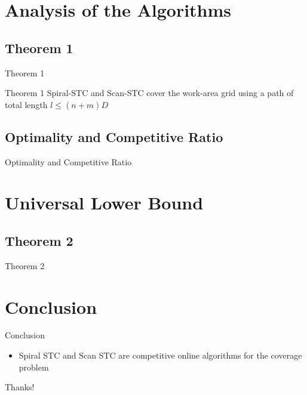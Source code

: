\documentclass{beamer}
\begin{document}
\section{Analysis of the Algorithms}
\subsection{Theorem 1}
\begin{frame}{Theorem 1}
    \begin{block}{Theorem 1}
        Spiral-STC and Scan-STC cover the work-area grid using a path of total length $l \leq (n + m)D$
    \end{block}
\end{frame}

\subsection{Optimality and Competitive Ratio}
\begin{frame}{Optimality and Competitive Ratio}
\end{frame}

\section{Universal Lower Bound}
\subsection{Theorem 2}
\begin{frame}{Theorem 2}
\end{frame}

\section{Conclusion}
\begin{frame}{Conclusion}
    \begin{itemize}
        \item Spiral STC and Scan STC are competitive online algorithms for the coverage problem
    \end{itemize}
\end{frame}

\begin{frame}[focus]
    Thanks!
\end{frame}

\end{document}
